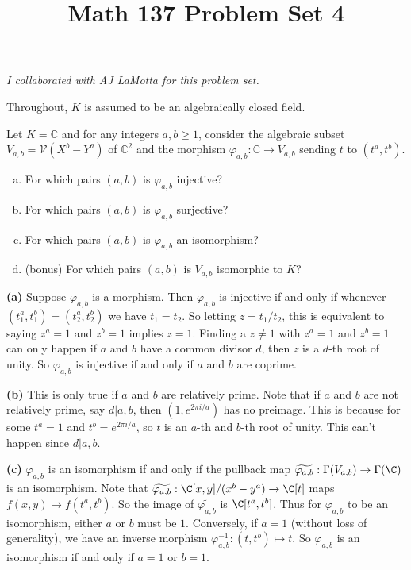 \documentclass[11pt,letterpaper]{article}
\title{\textbf{Math 137 Problem Set 4}}
\begin{document}
\maketitle

\begin{center}
    \textit{I collaborated with AJ LaMotta for this problem set.}
\end{center}

Throughout, $K$ is assumed to be an algebraically closed field.

\begin{problem}
    Let $K=\mathbb C$ and for any integers $a,b\geq1$, consider the algebraic subset $V_{a,b}=\mathcal{V} (X^b-Y^a)$ of $\mathbb C^2$ and the morphism $\varphi_{a,b}:\mathbb C\rightarrow V_{a,b}$ sending $t$ to $(t^a,t^b)$.
    \begin{enumerate}[(a)]
        \item For which pairs $(a,b)$ is $\varphi_{a,b}$ injective?
        \item For which pairs $(a,b)$ is $\varphi_{a,b}$ surjective?
        \item For which pairs $(a,b)$ is $\varphi_{a,b}$ an isomorphism?
        \item (bonus) For which pairs $(a,b)$ is $V_{a,b}$ isomorphic to $K$?
    \end{enumerate}
\end{problem}

\begin{solution}
    \textbf{(a)} Suppose $\varphi_{a,b}$ is a morphism. Then $\varphi_{a,b}$ is injective if and only if whenever $(t_1^a, t_1^b)=(t_2^a, t_2^b)$ we have $t_1=t_2$. So letting $z=t_1 /t_2$, this is equivalent to saying $z^a=1$ and $z^b=1$ implies $z=1$. Finding a $z\neq 1$ with $z^a=1$ and $z^b=1$ can only happen if $a$ and $b$ have a common divisor $d$, then $z$ is a $d$-th root of unity. So $\varphi_{a,b}$ is injective if and only if $a$ and $b$ are coprime.
    
    \textbf{(b)} This is only true if $a$ and $b$ are relatively prime. Note that if $a$ and $b$ are not relatively prime, say $d|a,b$, then $(1,e^{2\pi i /a})$ has no preimage. This is because for some $t^a=1$ and $t^b=e^{2\pi i /a}$, so $t$ is an $a$-th and $b$-th root of unity. This can't happen since $d|a,b$.  

    \textbf{(c)} $\varphi_{a,b}$ is an isomorphism if and only if the pullback map $\widetilde{\varphi_{a,b}} : \Gamma(V_{a,b}) \to \Gamma(\C)$ is an isomorphism. Note that $\widetilde{\varphi_{a,b}} : \C[x,y]/(x^b-y^a) \to \C[t]$ maps $f(x,y)\mapsto f(t^a, t^b)$. So the image of $\widetilde{\varphi_{a,b}}$ is $\C[t^a, t^b]$. Thus for $\varphi_{a,b}$ to be an isomorphism, either $a$ or $b$ must be $1$. Conversely, if $a=1$ (without loss of generality), we have an inverse morphism $\varphi_{a,b}^{-1} : (t,t^b) \mapsto t$. So $\varphi_{a,b}$ is an isomorphism if and only if $a=1$ or $b=1$.
\end{solution}
\end{document}
